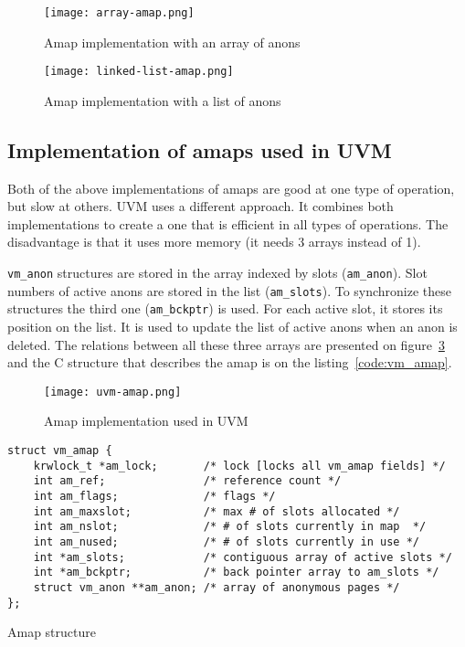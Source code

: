 \begin{figure}
  \centering
  \texttt{[image: array-amap.png]}
  \caption{Amap implementation with an array of anons \cite{cranor}}
  \label{img:array-amap}
\end{figure}

\begin{figure}
  \centering
  \texttt{[image: linked-list-amap.png]}
  \caption{Amap implementation with a list of anons \cite{cranor}}
  \label{img:list-amap}
\end{figure}

\subsection{Implementation of amaps used in UVM}

Both of the above implementations of amaps are good at one type of operation, but slow at others.
UVM uses a different approach.
It combines both implementations to create a one that is efficient in all types of operations.
The disadvantage is that it uses more memory (it needs 3 arrays instead of 1).

\texttt{vm_anon} structures are stored in the array indexed by slots (\texttt{am_anon}).
Slot numbers of active anons are stored in the list (\texttt{am_slots}).
To synchronize these structures the third one (\texttt{am_bckptr}) is used.
For each active slot, it stores its position on the list.
It is used to update the list of active anons when an anon is deleted.
The relations between all these three arrays are presented on figure~\ref{img:uvm_amap_impl}
and the C structure that describes the amap is on the listing~\ref{code:vm_amap}.

\begin{figure}
  \centering
  \texttt{[image: uvm-amap.png]}
  \caption{Amap implementation used in UVM \cite{cranor}}
  \label{img:uvm_amap_impl}
\end{figure}

\begin{listing}
  \begin{verbatim}
struct vm_amap {
    krwlock_t *am_lock;       /* lock [locks all vm_amap fields] */
    int am_ref;               /* reference count */
    int am_flags;             /* flags */
    int am_maxslot;           /* max # of slots allocated */
    int am_nslot;             /* # of slots currently in map  */
    int am_nused;             /* # of slots currently in use */
    int *am_slots;            /* contiguous array of active slots */
    int *am_bckptr;           /* back pointer array to am_slots */
    struct vm_anon **am_anon; /* array of anonymous pages */
};
  \end{verbatim}
  \caption{Amap structure}
  \label{code:vm_amap}
\end{listing}


